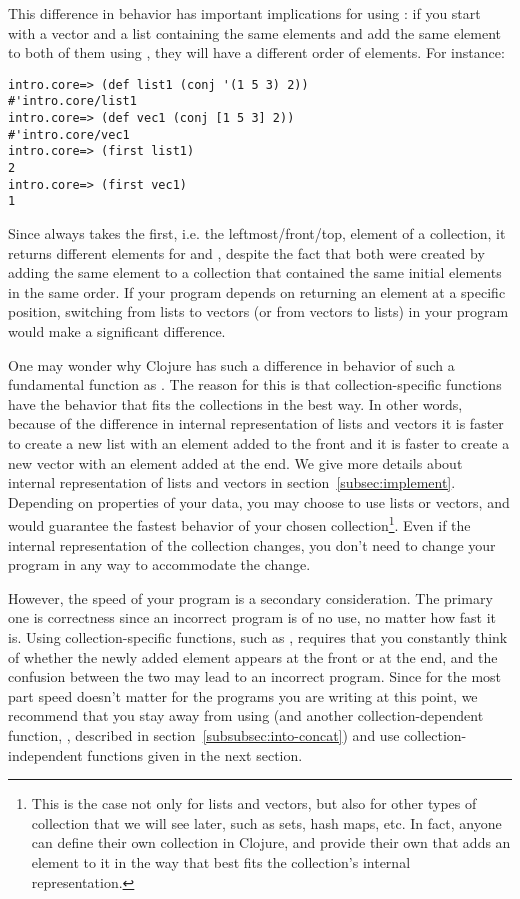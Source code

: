 This difference in behavior has important implications for using : if you start with a vector and a list containing the same elements and add the same element to both of them using , they will have a different order of elements. For instance: 
\begin{framed}
\begin{verbatim}
intro.core=> (def list1 (conj '(1 5 3) 2))
#'intro.core/list1
intro.core=> (def vec1 (conj [1 5 3] 2))
#'intro.core/vec1
intro.core=> (first list1)
2
intro.core=> (first vec1)
1
\end{verbatim}
\end{framed}
Since  always takes the first, i.e. the leftmost/front/top, element of a collection, it returns different elements for  and , despite the fact that both were created by adding the same element  to a collection that contained the same initial elements  in the same order. If your program depends on  returning an element at a specific position, switching from lists to vectors (or from vectors to lists) in your program would make a significant difference. 

One may wonder why Clojure has such a difference in behavior of such a fundamental function as . The reason for this is that collection-specific functions have the behavior that fits the collections  in the best way. In other words, because of the difference in internal representation of lists and vectors it is faster to create a new list with an element added to the front and it is faster to create a new vector with an element added at the end. We give more details about internal representation of lists and vectors in section~\ref{subsec:implement}. Depending on properties of your data, you may choose to use lists or vectors, and  would guarantee the fastest behavior of your chosen collection\footnote{This is the case not only for lists and vectors, but also for other types of collection that we will see later, such as sets, hash maps, etc. In fact, anyone can define their own collection in Clojure, and provide their own  that adds an element to it in the way that best fits the collection's internal representation.}. Even if the internal representation of the collection changes, you don't need to change your program in any way to accommodate the change. 

However, the speed of your program is a secondary consideration. The primary one is correctness since an incorrect program is of no use, no matter how fast it is. Using collection-specific functions, such as , requires that you constantly think of whether the newly added element appears at the front or at the end, and the confusion between the two may lead to an incorrect program. Since for the most part speed doesn't matter for the programs you are writing at this point, we recommend that you stay away from using  (and another collection-dependent function, , described in section~\ref{subsubsec:into-concat}) and use collection-independent functions given in the next section. 

